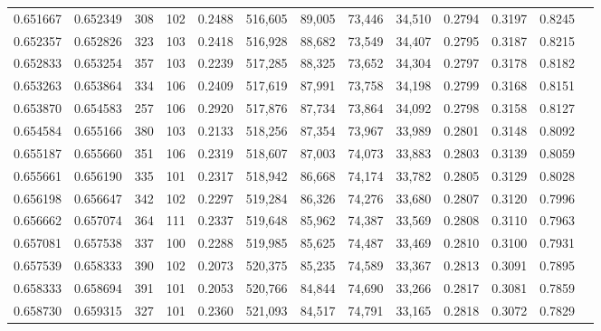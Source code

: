 \begin{tabular}{rrrrrrrrrrrrr}
0.651667 & 0.652349 &    308 &   102 &                                     0.2488 & 516,605 &  89,005 &  73,446 &  34,510 & 0.2794 & 0.3197 & 0.8245 \\
0.652357 & 0.652826 &    323 &   103 &                                     0.2418 & 516,928 &  88,682 &  73,549 &  34,407 & 0.2795 & 0.3187 & 0.8215 \\
0.652833 & 0.653254 &    357 &   103 &                                     0.2239 & 517,285 &  88,325 &  73,652 &  34,304 & 0.2797 & 0.3178 & 0.8182 \\
0.653263 & 0.653864 &    334 &   106 &                                     0.2409 & 517,619 &  87,991 &  73,758 &  34,198 & 0.2799 & 0.3168 & 0.8151 \\
0.653870 & 0.654583 &    257 &   106 &                                     0.2920 & 517,876 &  87,734 &  73,864 &  34,092 & 0.2798 & 0.3158 & 0.8127 \\
0.654584 & 0.655166 &    380 &   103 &                                     0.2133 & 518,256 &  87,354 &  73,967 &  33,989 & 0.2801 & 0.3148 & 0.8092 \\
0.655187 & 0.655660 &    351 &   106 &                                     0.2319 & 518,607 &  87,003 &  74,073 &  33,883 & 0.2803 & 0.3139 & 0.8059 \\
0.655661 & 0.656190 &    335 &   101 &                                     0.2317 & 518,942 &  86,668 &  74,174 &  33,782 & 0.2805 & 0.3129 & 0.8028 \\
0.656198 & 0.656647 &    342 &   102 &                                     0.2297 & 519,284 &  86,326 &  74,276 &  33,680 & 0.2807 & 0.3120 & 0.7996 \\
0.656662 & 0.657074 &    364 &   111 &                                     0.2337 & 519,648 &  85,962 &  74,387 &  33,569 & 0.2808 & 0.3110 & 0.7963 \\
0.657081 & 0.657538 &    337 &   100 &                                     0.2288 & 519,985 &  85,625 &  74,487 &  33,469 & 0.2810 & 0.3100 & 0.7931 \\
0.657539 & 0.658333 &    390 &   102 &                                     0.2073 & 520,375 &  85,235 &  74,589 &  33,367 & 0.2813 & 0.3091 & 0.7895 \\
0.658333 & 0.658694 &    391 &   101 &                                     0.2053 & 520,766 &  84,844 &  74,690 &  33,266 & 0.2817 & 0.3081 & 0.7859 \\
0.658730 & 0.659315 &    327 &   101 &                                     0.2360 & 521,093 &  84,517 &  74,791 &  33,165 & 0.2818 & 0.3072 & 0.7829 \\

\end{tabular}
